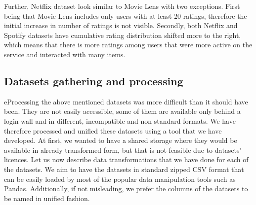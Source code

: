 Further, Netflix dataset look similar to Movie Lens with two exceptions. First being that Movie Lens includes only users with at least 20 ratings, therefore the initial increase in number of ratings is not visible. Secondly, both Netflix and Spotify datasets have cumulative rating distribution shifted more to the right, which means that there is more ratings among users that were more active on the service and interacted with many items.




\subsection{Datasets gathering and processing} \label{subsec:04_single_user_datasets.gathering_processing}

eProcessing the above mentioned datasets was more difficult than it should have been. They are not easily accessible, some of them are available only behind a login wall and in different, incompatible and non standard formats. We have therefore processed and unified these datasets using a tool that we have developed. At first, we wanted to have a shared storage where they would be available in already transformed form, but that is not feasible due to datasets' licences. Let us now describe data transformations that we have done for each of the datasets. We aim to have the datasets in standard zipped CSV format that can be easily loaded by most of the popular data manipulation tools such as Pandas. Additionally, if not misleading, we prefer the columns of the datasets to be named in unified fashion.

